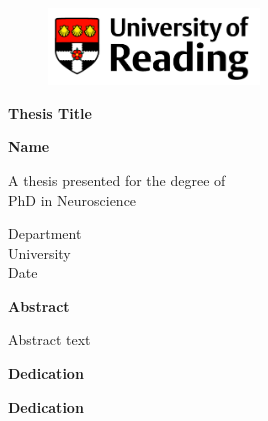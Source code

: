 \documentclass[11pt,oneside]{report} %
\begin{document}

\begin{figure}[t]
\includegraphics[width=0.5\textwidth]{reading_logo.png} %
\centering
\end{figure}

\begin{titlepage}
\begin{center}
  \vspace*{1cm}
 
   \Large
   \textbf{Thesis Title}
   
   \vspace{1.5 cm}
   \textbf{Name}
   
   \vspace{3 cm} %
    A thesis presented for the degree of\\
    PhD in Neuroscience
  
   \vspace{2 cm} %
   \Large
   Department\\
   University \\
   Date
\end{center}
\end{titlepage}

\newpage
\thispagestyle{empty}
\mbox{}



\newpage
\thispagestyle{plain}
\begin{center}
    \Huge
    \textbf{Abstract}
    
    \vspace{1cm}
    \large
    Abstract text 
\end{center}
 
\newpage
\thispagestyle{plain}
\begin{center}
    \Huge
    \textbf{Dedication}  
    
    \vspace{1cm}
    \Large
    \textbf{Dedication}
\end{center}
 
\end{document}
